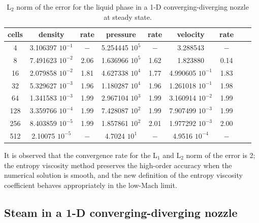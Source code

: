 \documentclass[preprint,10pt]{elsarticle}
\newcommand{\tcr}[1]{\textcolor{red}{#1}}
\newcommand{\tcb}[1]{\textcolor{blue}{#1}}
\begin{document}
%
%
\begin{table}[H]
\begin{center}
 \caption{\label{tbl:l2_norm_liq} L$_2$ norm of the error for the liquid phase in a 1-D converging-diverging nozzle at steady state.}
 \begin{tabular}{|c|c|c|c|c|c|c|c|c|}
 \hline
cells& density            & rate & pressure          & rate & velocity           & rate \\ \hline
4    & 3.106397 $10^{-1}$ & $-$  & 5.254445 $10^{5}$ & $-$  & 3.288543           & $-$  \\ \hline
8    & 7.491623 $10^{-2}$ & 2.06 & 1.636966 $10^{5}$ & 1.62 & 1.823880           & 0.14 \\ \hline
16   & 2.079858 $10^{-2}$ & 1.81 & 4.627338 $10^{4}$ & 1.77 & 4.990605 $10^{-1}$ & 1.83 \\ \hline
32   & 5.329627 $10^{-3}$ & 1.96 & 1.180287 $10^{4}$ & 1.96 & 1.261018 $10^{-1}$ & 1.98 \\ \hline
64   & 1.341583 $10^{-3}$ & 1.99 & 2.967104 $10^{3}$ & 1.99 & 3.160914 $10^{-2}$ & 1.99 \\ \hline
128  & 3.359766 $10^{-4}$ & 1.99 & 7.428087 $10^{2}$ & 1.99 & 7.907499 $10^{-3}$ & 1.99 \\ \hline
256  & 8.403859 $10^{-5}$ & 1.99 & 1.857861 $10^{2}$ & 2.01 & 1.977292 $10^{-3}$ & 2.00 \\ \hline
512  & 2.10075  $10^{-5}$ & $-$ & 4.7024   $10^{1}$ & $-$ & 4.9516   $10^{-4}$ & $-$ \\ \hline
\end{tabular}
\end{center}
\end{table}
It is observed that the convergence rate for the L$_1$ and L$_2$ norm of the error is 2; the entropy viscosity method preserves the high-order accuracy when the numerical solution is smooth, and the new definition of the entropy viscosity coefficient behaves appropriately in the low-Mach limit.

\subsection{Steam in a 1-D converging-diverging nozzle} \label{sec:steam_nozzle}
\end{document}
